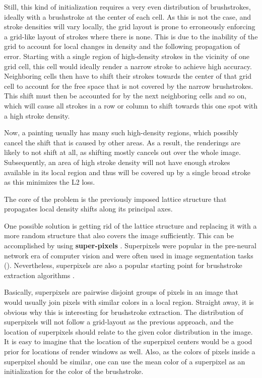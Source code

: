 Still, this kind of initialization requires a very even distribution of brushstrokes, ideally with a brushstroke at the center of each cell.
As this is not the case, and stroke densities will vary locally, the grid layout is prone to erroneously enforcing a grid-like layout of strokes where there is none.
This is due to the inability of the grid to account for local changes in density and the following propagation of error.
Starting with a single region of high-density strokes in the vicinity of one grid cell, this cell would ideally render a narrow stroke to achieve high accuracy.
Neighboring cells then have to shift their strokes towards the center of that grid cell to account for the free space that is not covered by the narrow brushstrokes.
This shift must then be accounted for by the next neighboring cells and so on, which will cause all strokes in a row or column to shift towards this one spot with a high stroke density.

Now, a painting usually has many such high-density regions, which possibly cancel the shift that is caused by other areas.
As a result, the renderings are likely to not shift at all, as shifting mostly cancels out over the whole image.
Subsequently, an area of high stroke density will not have enough strokes available in its local region and thus will be covered up by a single broad stroke as this minimizes the L2 loss.

The core of the problem is the previously imposed lattice structure that propagates local density shifts along its principal axes.

One possible solution is getting rid of the lattice structure and replacing it with a more random structure that also covers the image sufficiently.
This can be accomplished by using \textbf{super-pixels} \cite{superpixels}.
Superpixels were popular in the pre-neural network era of computer vision and were often used in image segmentation tasks (\cite{img segmentation with SP}).
Nevertheless, superpixels are also a popular starting point for brushstroke extraction algorithms \cite{brushs stroke extraction}.

Basically, superpixels are pairwise disjoint groups of pixels in an image that would usually join pixels with similar colors in a local region.
Straight away, it is obvious why this is interesting for brushstroke extraction.
The distribution of superpixels will not follow a grid-layout as the previous approach, and the location of superpixels should relate to the given color distribution in the image.
It is easy to imagine that the location of the superpixel centers would be a good prior for locations of render windows as well.
Also, as the colors of pixels inside a superpixel should be similar, one can use the mean color of a superpixel as an initialization for the color of the brushstroke.

